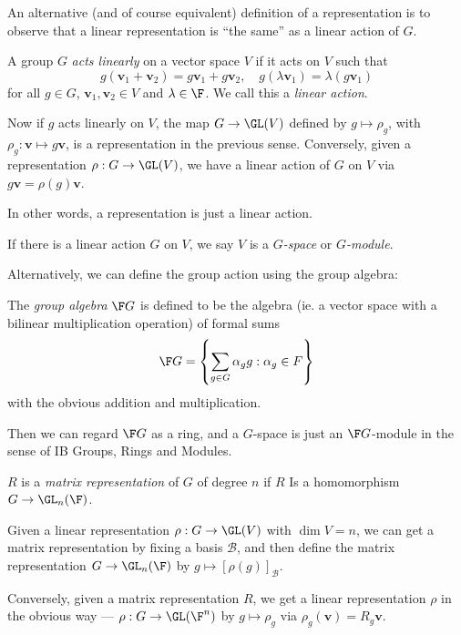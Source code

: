 \documentclass[a4paper]{article}
\begin{document}
An alternative (and of course equivalent) definition of a representation is to observe that a linear representation is ``the same'' as a linear action of $G$.
\begin{defi}
  A group $G$ \emph{acts linearly} on a vector space $V$ if it acts on $V$ such that
  \[
    g(\mathbf{v}_1 + \mathbf{v}_2) = g \mathbf{v}_1 + g \mathbf{v}_2,\quad g(\lambda \mathbf{v}_1) = \lambda (g\mathbf{v}_1)
  \]
  for all $g \in G$, $\mathbf{v}_1, \mathbf{v}_2 \in V$ and $\lambda \in \F$. We call this a \emph{linear action}.
\end{defi}
Now if $g$ acts linearly on $V$, the map $G \to \GL(V)$ defined by $g \mapsto \rho_g$, with $\rho_g: \mathbf{v} \mapsto g\mathbf{v}$, is a representation in the previous sense. Conversely, given a representation $\rho: G \to \GL(V)$, we have a linear action of $G$ on $V$ via $g\mathbf{v} = \rho(g) \mathbf{v}$.

In other words, a representation is just a linear action.

\begin{defi}
  If there is a linear action $G$ on $V$, we say $V$ is a \emph{$G$-space} or \emph{$G$-module}.
\end{defi}

Alternatively, we can define the group action using the group algebra:
\begin{defi}
  The \emph{group algebra} $\F G$ is defined to be the algebra (ie. a vector space with a bilinear multiplication operation) of formal sums
  \[
    \F G = \left\{ \sum_{g \in G} \alpha_g g: \alpha_g \in F\right\}
  \]
  with the obvious addition and multiplication.
\end{defi}
Then we can regard $\F G$ as a ring, and a $G$-space is just an $\F G$-module in the sense of IB Groups, Rings and Modules.

\begin{defi}
  $R$ is a \emph{matrix representation} of $G$ of degree $n$ if $R$ Is a homomorphism $G \to \GL_n(\F)$.
\end{defi}

Given a linear representation $\rho: G \to \GL(V)$ with $\dim V = n$, we can get a matrix representation by fixing a basis $\mathcal{B}$, and then define the matrix representation $G \to \GL_n(\F)$ by $g \mapsto [\rho(g)]_{\mathcal{B}}$.

Conversely, given a matrix representation $R$, we get a linear representation $\rho$ in the obvious way --- $\rho: G \to \GL(\F^n)$ by $g \mapsto \rho_g$ via $\rho_g(\mathbf{v}) = R_g \mathbf{v}$.
\end{document}
